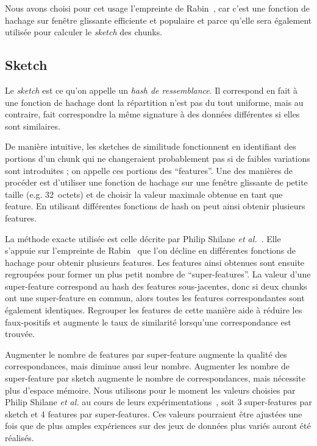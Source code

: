 \documentclass[a4paper]{report}
\makeatletter
\newcommand{\etal}{\emph{et al.}\@\xspace}
\makeatother
\begin{document}
Nous avons choisi pour cet usage l'empreinte de Rabin~\cite{rabin1981fingerprinting},
car c'est une fonction de hachage sur fenêtre glissante efficiente et populaire
et parce qu'elle sera également utilisée pour calculer le \emph{sketch} des chunks.

\subsection{Sketch}

Le \emph{sketch} est ce qu'on appelle un \emph{hash de ressemblance}.
Il correspond en fait à une fonction de hachage dont la répartition n'est pas du tout uniforme,
mais au contraire, fait correspondre la même signature à des données différentes si elles sont similaires.

De manière intuitive, les sketches de similitude fonctionnent en identifiant des portions d'un chunk
qui ne changeraient probablement pas si de faibles variations sont introduites ;
on appelle ces portions des ``features''.
Une des manières de procéder est d'utiliser une fonction de hachage sur une fenêtre glissante de petite taille
(e.g. 32~octets) et de choisir la valeur maximale obtenue en tant que feature.
En utilisant différentes fonctions de hash on peut ainsi obtenir plusieurs features.

La méthode exacte utilisée est celle décrite par Philip Shilane \etal~\cite{shilane2012wan}.
Elle s'appuie sur l'empreinte de Rabin~\cite{rabin1981fingerprinting}
que l'on décline en différentes fonctions de hachage pour obtenir plusieurs features.
Les features ainsi obtenues sont ensuite regroupées pour former un plus petit nombre de ``super-features''.
La valeur d'une super-feature correspond au hash des features sous-jacentes,
donc si deux chunks ont une super-feature en commun,
alors toutes les features correspondantes sont également identiques.
Regrouper les features de cette manière aide à réduire les faux-positifs
et augmente le taux de similarité lorsqu'une correspondance est trouvée.

Augmenter le nombre de features par super-feature augmente la qualité des correspondances,
mais diminue aussi leur nombre.
Augmenter les nombre de super-feature par sketch augmente le nombre de correspondances,
mais nécessite plus d'espace mémoire.
Nous utilisons pour le moment les valeurs choisies par Philip Shilane \etal
au cours de leurs expérimentations~\cite{shilane2012wan},
soit 3 super-features par sketch et 4 features par super-features.
Ces valeurs pourraient être ajustées une fois que de plus amples expériences
sur des jeux de données plus variés auront été réalisés.
\end{document}
